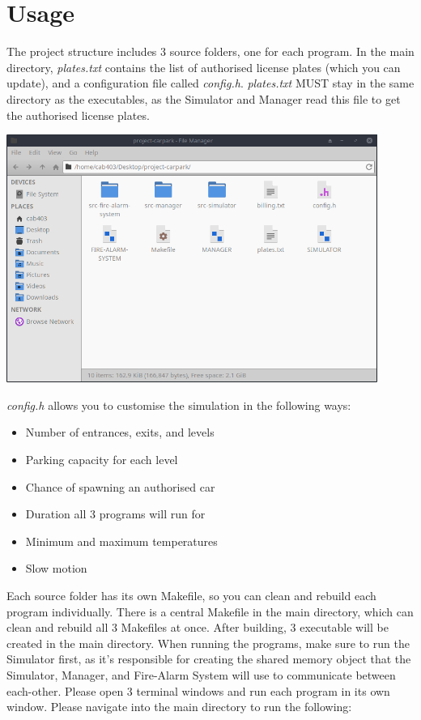 \documentclass[a4paper]{article}
\begin{document}
\newpage
\section{Usage}

\noindent The project structure includes 3 source folders, one for each program. In the main directory, \emph{plates.txt} contains the list of authorised license plates (which you can update), and a configuration file called \emph{config.h}. \emph{plates.txt} MUST stay in the same directory as the executables, as the Simulator and Manager read this file to get the authorised license plates.

\noindent \includegraphics[width=12.12cm]{report-img/project-structure.png}

\noindent \emph{config.h} allows you to customise the simulation in the following ways:
\begin{itemize}
  \item Number of entrances, exits, and levels
  \item Parking capacity for each level
  \item Chance of spawning an authorised car
  \item Duration all 3 programs will run for
  \item Minimum and maximum temperatures
  \item Slow motion
\end{itemize}

\noindent Each source folder has its own Makefile, so you can clean and rebuild each program individually. There is a central Makefile in the main directory, which can clean and rebuild all 3 Makefiles at once. After building, 3 executable will be created in the main directory. When running the programs, make sure to run the Simulator first, as it's responsible for creating the shared memory object that the Simulator, Manager, and Fire-Alarm System will use to communicate between each-other. Please open 3 terminal windows and run each program in its own window. Please navigate into the main directory to run the following:
\end{document}
